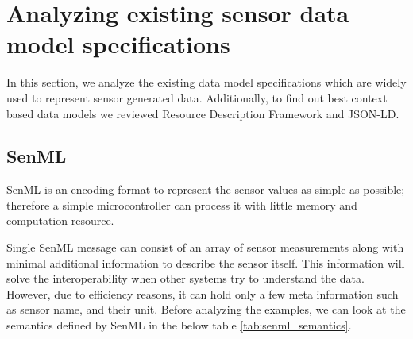 

	\let\cleardoublepage\clearpage
    \section{Analyzing existing sensor data model specifications}
    In this section, we analyze the existing data model specifications which are widely used to represent sensor generated data. Additionally, to find out best context based data models we reviewed Resource Description Framework and JSON-LD.
    
    \subsection{SenML}
    SenML is an encoding format to represent the sensor values as simple as possible; therefore a simple microcontroller can process it with little memory and computation resource.
    
    Single SenML message can consist of an array of sensor measurements along with minimal additional information to describe the sensor itself. This information will solve the interoperability when other systems try to understand the data. However, due to efficiency reasons, it can hold only a few meta information such as sensor name, and their unit. Before analyzing the examples, we can look at the semantics defined by SenML in the below table \ref{tab:senml_semantics}.
    
